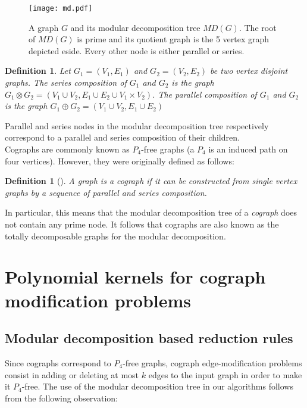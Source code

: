 \documentclass[11pt]{article}
\newtheorem{definition}[lemma]{Definition}
\begin{document}
\begin{figure}[t]
\centerline{\texttt{[image: md.pdf]}}
\caption{A graph $G$ and its modular decomposition tree $MD(G)$. The root of $MD(G)$ is prime and its quotient graph is the 5 vertex graph depicted eside. Every other node is either parallel or series.
\label{fig:md-tree}
}
\end{figure}

\begin{definition}
Let  $G_1=(V_1,E_1)$ and $G_2=(V_2,E_2)$ be two vertex disjoint graphs. The \emph{series composition} of $G_1$ and $G_2$ is the graph $G_1\otimes G_2=(V_1\cup V_2,E_1\cup E_2\cup V_1\times V_2)$. The \emph{parallel composition} of $G_1$ and $G_2$ is the graph $G_1\oplus G_2=(V_1\cup V_2,E_1\cup E_2)$
\end{definition}

Parallel and series nodes in the modular decomposition tree respectively correspond to a parallel and series composition of their children.  \\

Cographs are commonly known as $P_4$-free graphs (a $P_4$ is an induced path on four vertices). However, they were originally defined as follows:

\begin{definition}[\cite{BLS99}]
\label{def:cographs}
	A graph is a cograph if it can be constructed from single vertex graphs by a sequence of parallel and series composition.
\end{definition}

In particular, this means that the modular decomposition tree of a \emph{cograph} does not contain any prime node. It follows that cographs are also known as the totally decomposable graphs for the modular decomposition.

\section{Polynomial kernels for cograph modification problems}
\label{sec:kernels}

\subsection{Modular decomposition based reduction rules}


Since cographs correspond to $P_4$-free graphs, cograph edge-modification problems consist in adding or deleting at most $k$ edges to the input graph in order to make it $P_4$-free. The use of the modular decomposition tree in our algorithms follows from the following observation: 
\end{document}
